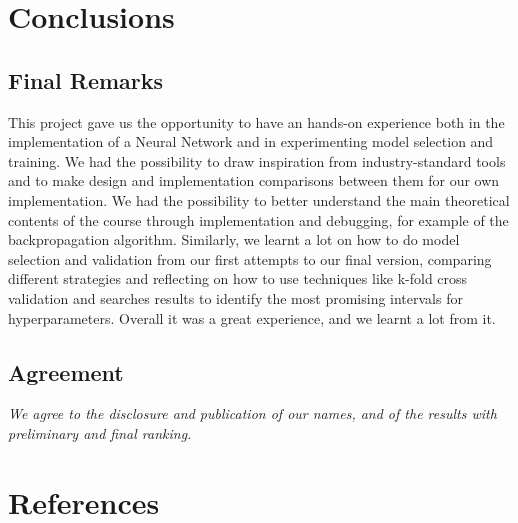 \section{Conclusions}

\subsection{Final Remarks}
This project gave us the opportunity to have an hands-on experience both in the implementation of a Neural Network and in experimenting model selection and training. We had the possibility to draw inspiration from industry-standard tools and to make design and implementation comparisons between them for our own implementation. We had the possibility to better understand the main theoretical contents of the course through implementation and debugging, for example of the backpropagation algorithm. Similarly, we learnt a lot on how to do model selection and validation from our first attempts to our final version, comparing different strategies and reflecting on how to use techniques like k-fold cross validation and searches results to identify the most promising intervals for hyperparameters. Overall it was a great experience, and we learnt a lot from it.

\subsection{Agreement}
\noindent\textit{We agree to the disclosure and publication of our names, and of the results with preliminary and final ranking.}

\section*{References}


\vspace{-1cm}


